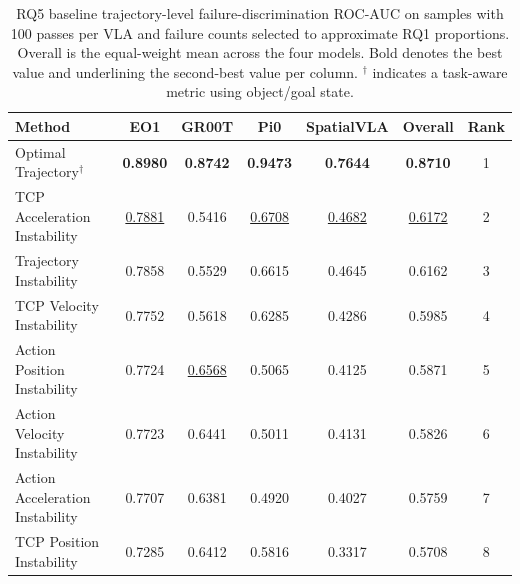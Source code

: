 \begin{table}[t]
\centering
\caption{RQ5 baseline trajectory-level failure-discrimination ROC-AUC on samples with 100 passes per VLA and failure counts selected to approximate RQ1 proportions. Overall is the equal-weight mean across the four models. Bold denotes the best value and underlining the second-best value per column. $^{\dagger}$ indicates a task-aware metric using object/goal state.}
\label{tab:rq5-baseline-performance}
{\scriptsize
\setlength{\tabcolsep}{4pt}
\begin{tabular}{lcccccc}
\toprule
Method & EO1 & GR00T & Pi0 & SpatialVLA & Overall & Rank \\
\midrule
Optimal Trajectory$^{\dagger}$ & \textbf{0.8980} & \textbf{0.8742} & \textbf{0.9473} & \textbf{0.7644} & \textbf{0.8710} & 1 \\
TCP Acceleration Instability & \underline{0.7881} & 0.5416 & \underline{0.6708} & \underline{0.4682} & \underline{0.6172} & 2 \\
Trajectory Instability & 0.7858 & 0.5529 & 0.6615 & 0.4645 & 0.6162 & 3 \\
TCP Velocity Instability & 0.7752 & 0.5618 & 0.6285 & 0.4286 & 0.5985 & 4 \\
Action Position Instability & 0.7724 & \underline{0.6568} & 0.5065 & 0.4125 & 0.5871 & 5 \\
Action Velocity Instability & 0.7723 & 0.6441 & 0.5011 & 0.4131 & 0.5826 & 6 \\
Action Acceleration Instability & 0.7707 & 0.6381 & 0.4920 & 0.4027 & 0.5759 & 7 \\
TCP Position Instability & 0.7285 & 0.6412 & 0.5816 & 0.3317 & 0.5708 & 8 \\
\bottomrule
\end{tabular}
}
\end{table}
